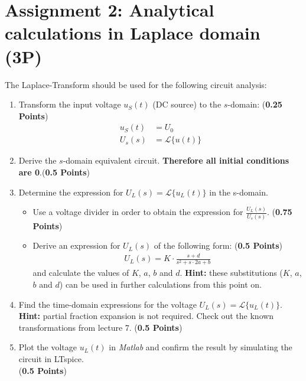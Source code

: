 \documentclass[a4paper]{article}
\begin{document}
	\section*{Assignment 2: Analytical  calculations in Laplace domain (3P)}
The Laplace-Transform should be used for the following circuit analysis:
\begin{enumerate}
	\item Transform the input voltage $u_S(t)$ (DC source) to the $s$-domain: (\textbf{0.25 Points})
	\begin{align*}
	u_S(t)&= U_0\\
	U_s(s) &= \mathcal{L}\{u(t)\}
	\end{align*}
	\item Derive the $s$-domain equivalent circuit. \textbf{Therefore all initial conditions are 0}.(\textbf{0.5 Points}) 
	\item Determine the expression for $U_L(s) = \mathcal{L}\{u_L(t)\}$ in the s-domain. 
	\begin{itemize}
	\item Use a voltage divider in order to obtain the expression for $\frac{U_L(s)}{U_s(s)}$. (\textbf{0.75 Points})
	\item Derive an expression for $U_L(s)$ of the following form: (\textbf{0.5 Points})
	\begin{align*}
		U_L(s) = K\cdot \frac{s+d}{s^2+s\cdot 2a+b}
	\end{align*}
	and calculate the values of $K$, $a$, $b$ and $d$. \textbf{Hint:} these substitutions ($K$, $a$, $b$ and $d$) can be used in further calculations from this point on.
	\end{itemize}
	\item Find the time-domain expressions for the voltage $U_L(s) = \mathcal{L}\{u_L(t)\}$. \\
	\textbf{Hint:} partial fraction expansion is not required. Check out the known transformations from lecture 7. (\textbf{0.5 Points})
	\item Plot the voltage $u_L(t)$ in \textit{Matlab} and confirm the result by simulating the circuit in LTspice.\\(\textbf{0.5 Points})
\end{enumerate}
\pagebreak
\end{document}
